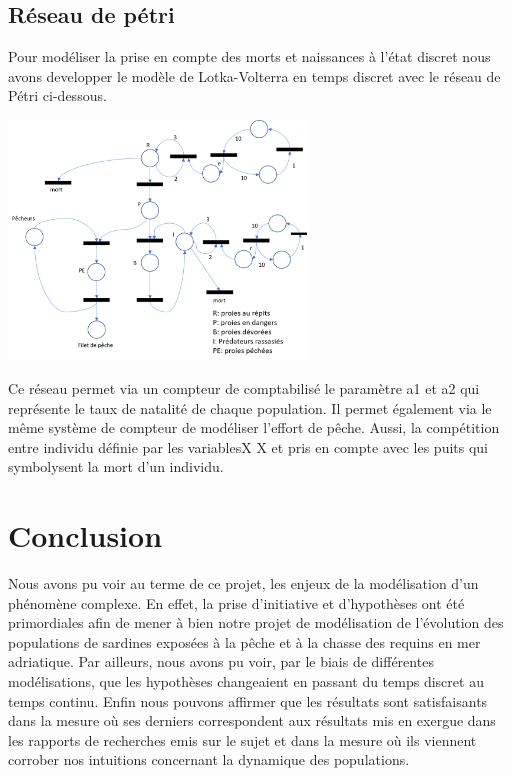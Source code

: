 \documentclass[a4paper, 11pt]{report}%
\begin{document}
        \subsection{Réseau de pétri}
        Pour modéliser la prise en compte des morts et naissances à l'état discret nous avons developper
        le modèle de Lotka-Volterra en temps discret avec le réseau de Pétri ci-dessous. 

        \begin{center}
            \includegraphics[width=8cm]{figures/reseau_petri.png}
        \end{center}

        Ce réseau permet via un compteur de comptabilisé le paramètre a1 et a2 qui représente le taux de
        natalité de chaque population. Il permet également via le même système de compteur de modéliser 
        l'effort de pêche. Aussi, la compétition entre individu définie par les variablesX X  et pris en
        compte avec les puits qui symbolysent la mort d'un individu. 
    \section{Conclusion}
    Nous avons pu voir au terme de ce projet, les enjeux de la modélisation d'un phénomène complexe. En effet, 
    la prise d'initiative et d'hypothèses ont été primordiales afin de mener à bien notre projet de modélisation 
    de l'évolution des populations de sardines exposées à la pêche et à la chasse des requins en mer adriatique. 
    Par ailleurs, nous avons pu voir, par le biais de différentes modélisations, que les hypothèses changeaient
    en passant du temps discret au temps continu. Enfin nous pouvons affirmer que les résultats sont satisfaisants
    dans la mesure où ses derniers correspondent aux résultats mis en exergue dans les rapports de recherches emis 
    sur le sujet et dans la mesure où ils viennent corrober nos intuitions concernant la dynamique des populations.
    \nocite{*}
    
\end{document}
